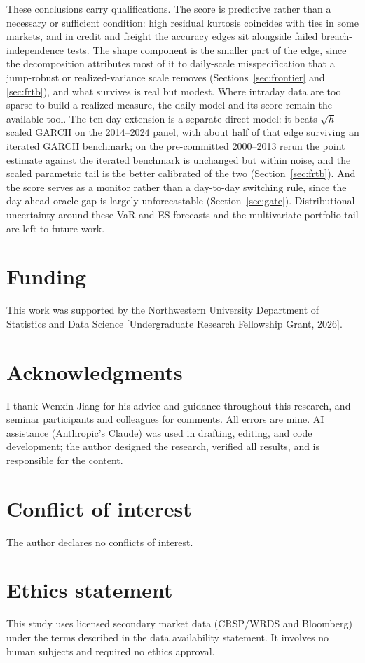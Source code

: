 \documentclass[11pt]{article}
\theoremstyle{remark}
\begin{document}
These conclusions carry qualifications. The score is predictive rather than a necessary or sufficient condition: high residual kurtosis coincides with ties in some markets, and in credit and freight the accuracy edges sit alongside failed breach-independence tests. The shape component is the smaller part of the edge, since the decomposition attributes most of it to daily-scale misspecification that a jump-robust or realized-variance scale removes (Sections~\ref{sec:frontier} and \ref{sec:frtb}), and what survives is real but modest. Where intraday data are too sparse to build a realized measure, the daily model and its score remain the available tool. The ten-day extension is a separate direct model: it beats $\sqrt{h}$-scaled GARCH on the 2014--2024 panel, with about half of that edge surviving an iterated GARCH benchmark; on the pre-committed 2000--2013 rerun the point estimate against the iterated benchmark is unchanged but within noise, and the scaled parametric tail is the better calibrated of the two (Section~\ref{sec:frtb}). And the score serves as a monitor rather than a day-to-day switching rule, since the day-ahead oracle gap is largely unforecastable (Section~\ref{sec:gate}).
Distributional uncertainty around these VaR and ES forecasts and the multivariate portfolio tail are left to future work.

\section*{Funding}
This work was supported by the Northwestern University Department of
Statistics and Data Science [Undergraduate Research Fellowship Grant,
2026].

\section*{Acknowledgments}
I thank Wenxin Jiang for his advice and guidance throughout this
research, and seminar participants and colleagues for comments. All
errors are mine.
AI assistance (Anthropic's Claude) was used in drafting, editing, and
code development; the author designed the research, verified all
results, and is responsible for the content.

\section*{Conflict of interest}
The author declares no conflicts of interest.

\section*{Ethics statement}
This study uses licensed secondary market data (CRSP/WRDS and
Bloomberg) under the terms described in the data availability
statement. It involves no human subjects and required no ethics
approval.
\end{document}
